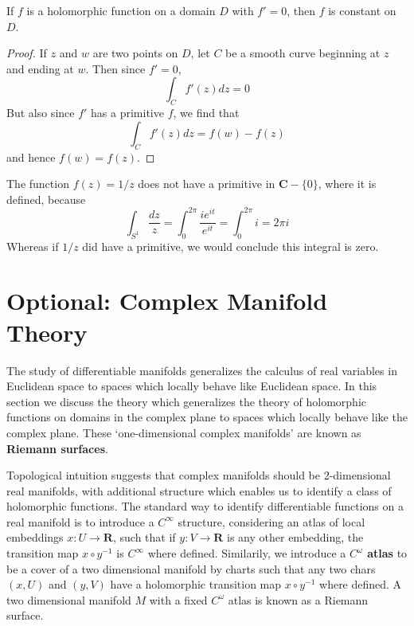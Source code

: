 \begin{corollary}
    If $f$ is a holomorphic function on a domain $D$ with $f' = 0$, then $f$ is constant on $D$.
\end{corollary}
\begin{proof}
    If $z$ and $w$ are two points on $D$, let $C$ be a smooth curve beginning at $z$ and ending at $w$. Then since $f' = 0$,
    \[ \int_C f'(z) dz = 0  \]
    But also since $f'$ has a primitive $f$, we find that
    \[ \int_C f'(z) dz = f(w) - f(z) \]
    and hence $f(w) = f(z)$.
\end{proof}

\begin{example}
    The function $f(z) = 1/z$ does not have a primitive in $\mathbf{C} - \{ 0 \}$, where it is defined, because
    \[ \int_{S^1} \frac{dz}{z} = \int_0^{2\pi} \frac{ie^{it}}{e^{it}} = \int_0^{2\pi} i = 2 \pi i \]
    Whereas if $1/z$ did have a primitive, we would conclude this integral is zero.
\end{example}














\section{Optional: Complex Manifold Theory}

The study of differentiable manifolds generalizes the calculus of real variables in Euclidean space to spaces which locally behave like Euclidean space. In this section we discuss the theory which generalizes the theory of holomorphic functions on domains in the complex plane to spaces which locally behave like the complex plane. These `one-dimensional complex manifolds' are known as {\bf Riemann surfaces}.

Topological intuition suggests that complex manifolds should be 2-dimensional real manifolds, with additional structure which enables us to identify a class of holomorphic functions. The standard way to identify differentiable functions on a real manifold is to introduce a $C^\infty$ structure, considering an atlas of local embeddings $x: U \to \mathbf{R}$, such that if $y: V \to \mathbf{R}$ is any other embedding, the transition map $x \circ y^{-1}$ is $C^\infty$ where defined. Similarily, we introduce a {\bf $C^\omega$ atlas} to be a cover of a two dimensional manifold by charts such that any two chars $(x,U)$ and $(y,V)$ have a holomorphic transition map $x \circ y^{-1}$ where defined. A two dimensional manifold $M$ with a fixed $C^\omega$ atlas is known as a Riemann surface.

